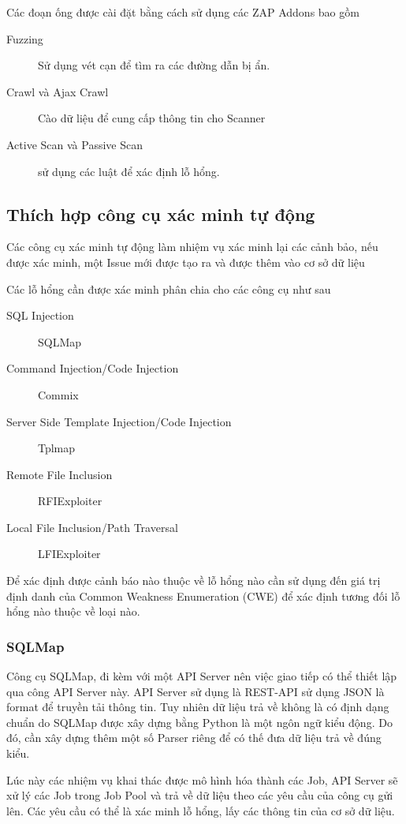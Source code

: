 \documentclass[./../main.tex]{subfiles}
\begin{document}
Các đoạn ống được cài đặt bằng cách sử dụng các ZAP Addons bao gồm
\begin{description}
	\item[Fuzzing] Sử dụng vét cạn để tìm ra các đường dẫn bị ẩn.
	\item[Crawl và Ajax Crawl] Cào dữ liệu để cung cấp thông tin cho Scanner
	\item[Active Scan và Passive Scan] sử dụng các luật để xác định lỗ hổng.
\end{description}

\subsection{Thích hợp công cụ xác minh tự động}
Các công cụ xác minh tự động làm nhiệm vụ xác minh lại các cảnh bảo, nếu được xác minh, một Issue mới được tạo ra và được thêm vào cơ sở dữ liệu

Các lỗ hổng cần được xác minh phân chia cho các công cụ như sau
\begin{description}
	\item[SQL Injection] SQLMap
	\item [Command Injection/Code Injection] Commix
	\item [Server Side Template Injection/Code Injection] Tplmap
	\item [Remote File Inclusion] RFIExploiter
	\item [Local File Inclusion/Path Traversal] LFIExploiter
\end{description}
Để xác định được cảnh báo nào thuộc về lỗ hổng nào cần sử dụng đến giá trị định danh của Common Weakness Enumeration (CWE) để xác định tương đối lỗ hổng nào thuộc về loại nào.
\subsubsection{SQLMap}
Công cụ SQLMap, đi kèm với một API Server nên việc giao tiếp có thể thiết lập qua công API Server này. API Server sử dụng là REST-API sử dụng JSON là format để truyền tải thông tin. Tuy nhiên dữ liệu trả về không là có định dạng chuẩn do SQLMap được xây dựng bằng Python là một ngôn ngữ kiểu động. Do đó, cần xây dựng thêm một số Parser riêng để có thế đưa dữ liệu trả về đúng kiểu.

Lúc này các nhiệm vụ khai thác được mô hình hóa thành các Job, API Server sẽ xử lý các Job trong Job Pool và trả về dữ liệu theo các yêu cầu của công cụ gửi lên. Các yêu cầu có thể là xác minh lỗ hổng, lấy các thông tin của cơ sở dữ liệu.
\end{document}
